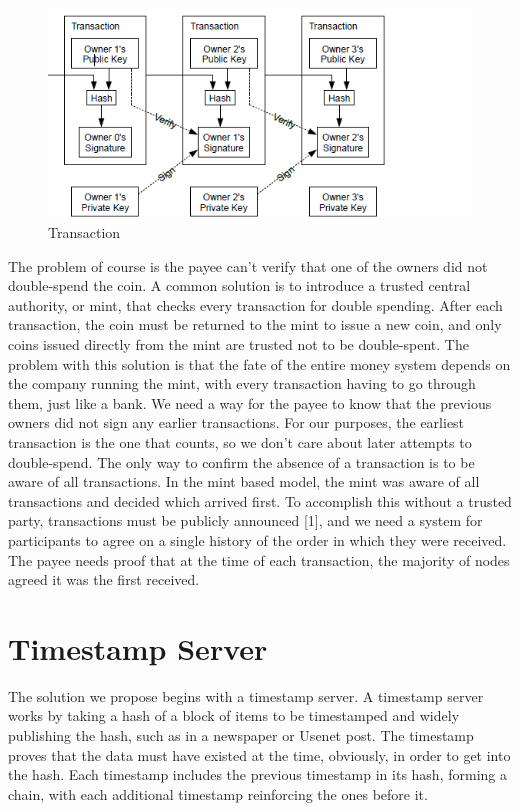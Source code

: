 \begin{figure}[ht!]
\centering
\includegraphics[trim = 0mm 0mm 30mm 0mm, width=120mm]{transaction}
\caption{Transaction}
\end{figure}

The problem of course is the payee can't verify that one of the owners did not double-spend
the coin. A common solution is to introduce a trusted central authority, or mint, that checks every
transaction for double spending. After each transaction, the coin must be returned to the mint to
issue a new coin, and only coins issued directly from the mint are trusted not to be double-spent.
The problem with this solution is that the fate of the entire money system depends on the
company running the mint, with every transaction having to go through them, just like a bank.
We need a way for the payee to know that the previous owners did not sign any earlier
transactions. For our purposes, the earliest transaction is the one that counts, so we don't care
about later attempts to double-spend. The only way to confirm the absence of a transaction is to
be aware of all transactions. In the mint based model, the mint was aware of all transactions and
decided which arrived first. To accomplish this without a trusted party, transactions must be
publicly announced [1], and we need a system for participants to agree on a single history of the
order in which they were received. The payee needs proof that at the time of each transaction, the
majority of nodes agreed it was the first received.

\section{Timestamp Server}

The solution we propose begins with a timestamp server. A timestamp server works by taking a hash of a block of items to be timestamped and widely publishing the hash, such as in a newspaper or Usenet post. The timestamp proves that the data must have existed at the time, obviously, in order to get into the hash. Each timestamp includes the previous timestamp in its hash, forming a chain, with each additional timestamp reinforcing the ones before it.

